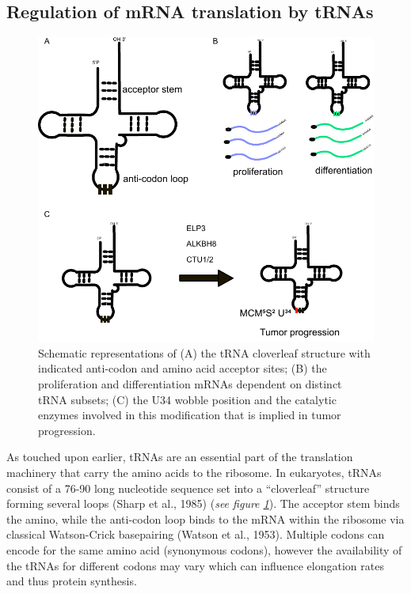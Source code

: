 \documentclass[12pt,openany]{book}
\begin{document}
\subsection{Regulation of mRNA translation by tRNAs} \label{tRNA}\begin{figure}
  \includegraphics{./figures/tRNA.pdf}
  \caption{ Schematic representations of (A) the tRNA cloverleaf structure with indicated anti-codon and amino acid acceptor sites;  (B)  the proliferation and differentiation mRNAs dependent on distinct tRNA subsets; (C) the U34 wobble position and the catalytic enzymes involved in this modification that is implied in tumor progression.
 \label{fig:tRNA}}
\end{figure}

As touched upon earlier, tRNAs are an essential part of the translation
machinery that carry the amino acids to the ribosome. In eukaryotes,
tRNAs consist of a 76-90 long nucleotide sequence set into a
``cloverleaf'' structure forming several loops (Sharp et al., 1985)
(\emph{see figure \ref{fig:tRNA}}). The acceptor stem binds the amino,
while the anti-codon loop binds to the mRNA within the ribosome via
classical Watson-Crick basepairing (Watson et al., 1953). Multiple
codons can encode for the same amino acid (synonymous codons), however
the availability of the tRNAs for different codons may vary which can
influence elongation rates and thus protein synthesis.
\end{document}
